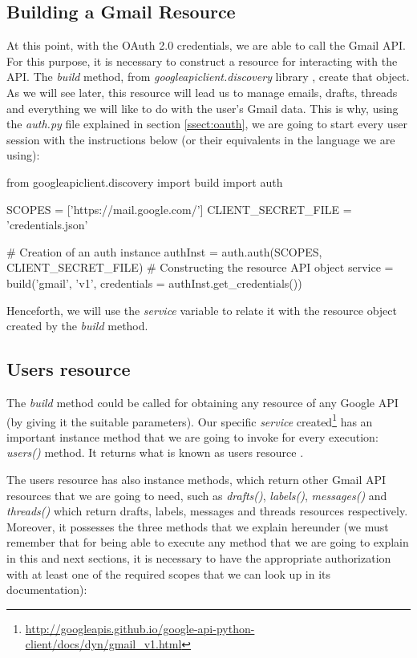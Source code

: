 \subsection{Building a Gmail Resource}
At this point, with the OAuth 2.0 credentials, we are able to call the Gmail API. For this purpose, it is necessary to construct a resource \citep[/v1/reference]{gmailAPI} for interacting with the API. The \textit{build} method, from \textit{googleapiclient.discovery} library \citep{build-module}, create that object. As we will see later, this resource will lead us to manage emails, drafts, threads and everything we will like to do with the user's Gmail data. This is why, using the \textit{auth.py} file explained in section \ref{ssect:oauth}, we are going to start every user session with the instructions below (or their equivalents in the language we are using):

\begin{python}
from googleapiclient.discovery import build
import auth

SCOPES = ['https://mail.google.com/']
CLIENT_SECRET_FILE = 'credentials.json'

# Creation of an auth instance
authInst = auth.auth(SCOPES, CLIENT_SECRET_FILE)
# Constructing the resource API object
service = build('gmail', 'v1', credentials = authInst.get_credentials())
\end{python}

Henceforth, we will use the \textit{service} variable to relate it with the resource object created by the \textit{build} method.

\subsection{Users resource}\label{ssect:userres}
The \textit{build} method could be called for obtaining any resource of any Google API (by giving it the suitable parameters). Our specific \textit{service} created\footnote{\url{http://googleapis.github.io/google-api-python-client/docs/dyn/gmail\_v1.html}} has an important instance method that we are going to invoke for every execution: \textit{users()} method. It returns what is known as users resource \citep[/v1/reference/users]{gmailAPI}.

The users resource has also instance methods, which return other Gmail API resources that we are going to need, such as \textit{drafts()}, \textit{labels()}, \textit{messages()} and \textit{threads()} which return drafts, labels, messages and threads resources respectively. Moreover, it possesses the three methods that we explain hereunder (we must remember that for being able to execute any method that we are going to explain in this and next sections, it is necessary to have the appropriate authorization with at least one of the required scopes that we can look up in its documentation):


